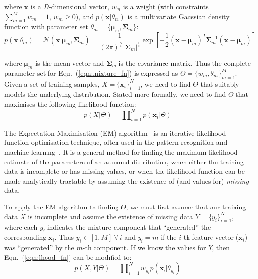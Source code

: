\documentclass[10pt,a4paper]{article}
\def\Vec#1{{\boldsymbol{#1}}}
\def\Mat#1{{\boldsymbol{#1}}}
\begin{document}
\noindent
where $\Vec{x}$ is a $D$-dimensional vector,
$w_m$ is a weight (with constraints $\sum\nolimits_{m=1}^{M} w_m = 1$, $w_m \geq 0$),
and
$p(\Vec{x}| \theta_m)$ is a multivariate Gaussian density function with parameter set $\theta_m = \{ \Vec{\mu}_m, \Mat{\Sigma}_m \}$:
%
\begin{equation}
	p(\Vec{x}| \theta_m) =  {{\mathcal{N}}}( \Vec{x} | \Vec{\mu}_m, \Mat{\Sigma}_m )  = 
		\frac{1}{ (2\pi)^{\frac{D}{2}} | \Mat{\Sigma}_m|^{\frac{1}{2}} }
		\exp \left[ -\frac{1}{2} (\Vec{x}-\Vec{\mu}_m)^T \Mat{\Sigma}_m^{-1} (\Vec{x}-\Vec{\mu}_m) \right]
%
\end{equation}%

\noindent
where $\Vec{\mu}_m$ is the mean vector and $\Mat{\Sigma}_m$ is the covariance matrix.
Thus the complete parameter set for Eqn.~(\ref{eqn:mixture_fn}) is expressed as $\Theta = \{w_m, \theta_m\}_{m=1}^{M}$.
Given a set of training samples, $X=\{\Vec{x}_i\}_{i=1}^{N}$,
we need to find $\Theta$ that suitably models the underlying distribution.
Stated more formally, we need to find $\Theta$ that maximises the following likelihood function:
%
\begin{equation}
	p(X | \Theta) = \prod\nolimits_{i=1}^{N} p(\Vec{x}_i | \Theta)
	\label{eqn:lhood_fn}
\end{equation}

The Expectation-Maximisation (EM) algorithm~\cite{Dempster77, McLachlan-2008, Moon96, Redner84} is an iterative likelihood function optimisation technique,
often used in the pattern recognition and machine learning~\cite{Bishop_2006,Duda01}.
It is a general method for finding the maximum-likelihood estimate of the parameters of an assumed distribution,
when either the training data is incomplete or has missing values, or when the likelihood function can be made analytically tractable
by assuming the existence of (and values for) {\it missing} data.

To apply the EM algorithm to finding $\Theta$, we must first assume that our training data $X$ is incomplete
and assume the existence of missing data $Y = \{y_i\}_{i=1}^{N}$,
where each $y_i$ indicates the mixture component that ``generated'' the corresponding $\Vec{x}_i$.
Thus $y_i \in [1,M] ~ \forall ~ i$ and $y_i = m$ if the $i$-th feature vector ($\Vec{x}_i$) was ``generated'' by the $m$-th component.
If we know the values for $Y$, then Eqn.~(\ref{eqn:lhood_fn}) can be modified to:
%
\begin{equation}
	p(X,Y | \Theta) = \prod\nolimits_{i=1}^{N} w_{y_i} p(\Vec{x}_i| \theta_{y_i})
	\label{eqn:lhood_fn_modified}
\end{equation}
\end{document}
